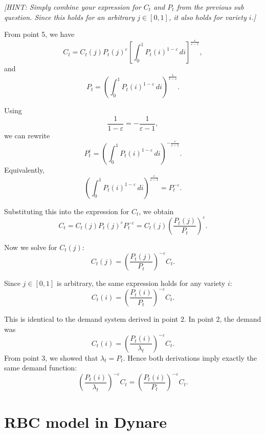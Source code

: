 \documentclass[dvipsnames,11pt]{article}
\begin{document}
\begin{enumerate}
            \textit{[HINT: Simply combine your expression for $C_t$ and $P_t$ from the previous sub question. Since this holds for an arbitrary $j \in [0,1]$, it also holds for variety $i$.]}

\begin{solution}

From point 5, we have
\[
C_t
=
C_t(j)P_t(j)^{\varepsilon}
\left[\int_0^1 P_t(i)^{1-\varepsilon}\,di\right]^{\frac{\varepsilon}{\varepsilon-1}},
\]
and
\[
P_t=
\left(\int_0^1 P_t(i)^{1-\varepsilon}\,di\right)^{\frac{1}{1-\varepsilon}}.
\]

Using
\[
\frac{1}{1-\varepsilon}=-\frac{1}{\varepsilon-1},
\]
we can rewrite
\[
P_t^\varepsilon
=
\left(\int_0^1 P_t(i)^{1-\varepsilon}\,di\right)^{-\frac{\varepsilon}{\varepsilon-1}}.
\]
Equivalently,
\[
\left(\int_0^1 P_t(i)^{1-\varepsilon}\,di\right)^{\frac{\varepsilon}{\varepsilon-1}}
=
P_t^{-\varepsilon}.
\]

Substituting this into the expression for \(C_t\), we obtain
\[
C_t
=
C_t(j)P_t(j)^{\varepsilon}P_t^{-\varepsilon}
=
C_t(j)\left(\frac{P_t(j)}{P_t}\right)^{\varepsilon}.
\]

Now we solve for \(C_t(j)\):
\[
C_t(j)
=
\left(\frac{P_t(j)}{P_t}\right)^{-\varepsilon}C_t.
\]

Since \(j\in[0,1]\) is arbitrary, the same expression holds for any variety \(i\):
\[
C_t(i)=\left(\frac{P_t(i)}{P_t}\right)^{-\varepsilon}C_t
.
\]

This is identical to the demand system derived in point 2. In point 2, the demand was
\[
C_t(i)=\left(\frac{P_t(i)}{\lambda_t}\right)^{-\varepsilon}C_t.
\]
From point 3, we showed that \(\lambda_t=P_t\). Hence both derivations imply exactly the same demand function:
\[
\left(\frac{P_t(i)}{\lambda_t}\right)^{-\varepsilon}C_t
=
\left(\frac{P_t(i)}{P_t}\right)^{-\varepsilon}C_t.
\]

\end{solution}                
\end{enumerate}





%


\newpage

\section{RBC model in Dynare}
\end{document}
